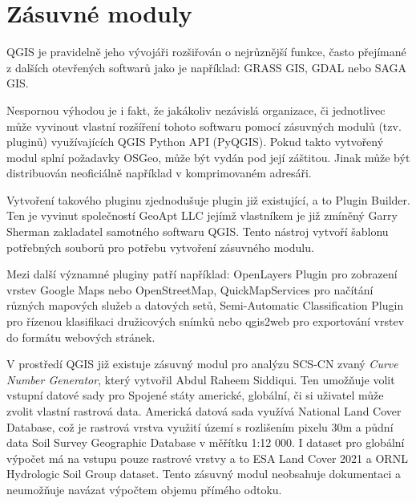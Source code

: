 \documentclass[a4paper,oneside,12pt]{book}
\begin{document}
 \section{Zásuvné moduly} \label{moduly}

\hspace{10mm} QGIS je pravidelně jeho vývojáři rozšiřován o nejrůznější funkce, často přejímané z dalších otevřených softwarů jako je například: GRASS GIS, GDAL nebo SAGA GIS.\cite{Baghdadi2018}

\hspace{10mm} Nespornou výhodou je i fakt, že jakákoliv nezávislá organizace, či jednotlivec může vyvinout vlastní rozšíření tohoto softwaru pomocí zásuvných modulů (tzv. pluginů) využívajících QGIS Python API (PyQGIS). Pokud takto vytvořený modul splní požadavky OSGeo, může být vydán pod její záštitou. Jinak může být distribuován neoficiálně například v komprimovaném adresáři.

\hspace{10mm} Vytvoření takového pluginu zjednodušuje plugin již existující, a to Plugin Builder. Ten je vyvinut společností GeoApt LLC jejímž vlastníkem je již zmíněný Garry Sherman zakladatel samotného softwaru QGIS. Tento nástroj vytvoří šablonu potřebných souborů pro potřebu vytvoření zásuvného modulu. \cite{QPwvEntkWdxPk0Lz}

\hspace{10mm} Mezi další významné pluginy patří například: OpenLayers Plugin pro zobrazení vrstev Google Maps nebo OpenStreetMap, QuickMapServices pro načítání různých mapových služeb a datových setů, Semi-Automatic Classification Plugin pro řízenou klasifikaci družicových snímků nebo qgis2web pro exportování vrstev do formátu webových stránek. \cite{QPwvEntkWdxPk0Lz}

\hspace{10mm} V prostředí QGIS již existuje zásuvný modul pro analýzu SCS-CN zvaný \textit{Curve Number Generator}, který vytvořil Abdul Raheem Siddiqui. Ten umožňuje volit vstupní datové sady pro Spojené státy americké, globální, či si uživatel může zvolit vlastní rastrová data. Americká datová sada využívá National Land Cover Database, což je rastrová vrstva využití území s rozlišením pixelu 30m a půdní data Soil Survey Geographic Database v měřítku 1:12 000. I dataset pro globální výpočet má na vstupu pouze rastrové vrstvy a to ESA Land Cover 2021 a ORNL Hydrologic Soil Group dataset. Tento zásuvný modul neobsahuje dokumentaci a neumožňuje navázat výpočtem objemu přímého odtoku. \cite{siddiqui2020}
\end{document}
